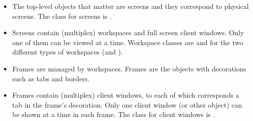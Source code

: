 \begin{itemize}
  \item The top-level objects that matter are screens and they correspond
    to physical screens. The class for screens is .
  \item Screens contain (multiplex) workspaces and full screen client
    windows. Only one of them can be viewed at a time.
    Workspace classes are  and  
    for the two different types of workspaces (and ).
  \item Frames are managed by workspaces. Frames are the objects with 
    decorations such as tabs and borders.
  \item Frames contain (multiplex) client windows, to each of which
    corresponds a tab in the frame's decoration. Only one client
    window (or other object) can be shown at a time in each frame.
    The class for client windows is .
\end{itemize}

